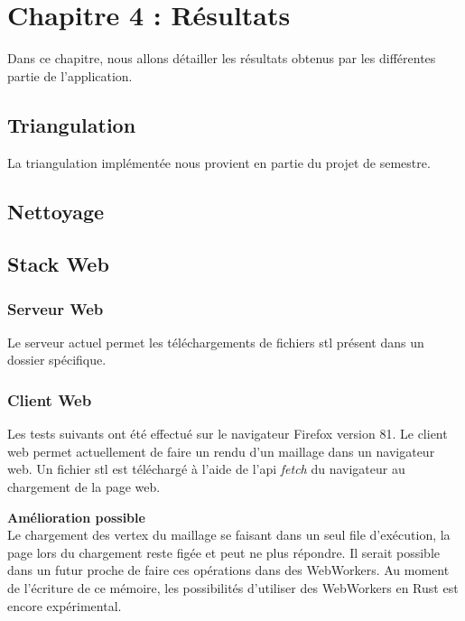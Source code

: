 
\chapter{Chapitre 4 : Résultats}
Dans ce chapitre, nous allons détailler les résultats obtenus par les
différentes partie de l'application.
\section{Triangulation}

La triangulation implémentée nous provient en partie du projet de semestre.

\section{Nettoyage}

\section{Stack Web}
\subsection{Serveur Web}

Le serveur actuel permet les téléchargements de fichiers \gls{stl} présent dans
un dossier spécifique. 

\subsection{Client Web}
Les tests suivants ont été effectué sur le navigateur Firefox version 81.
Le client web permet actuellement de faire un rendu d'un maillage dans un
navigateur web. Un fichier \gls{stl} est téléchargé à l'aide de l'api
\textit{fetch} du navigateur au chargement de la page web.

\textbf{Amélioration possible} \\
Le chargement des vertex du maillage se faisant dans un seul file d'exécution,
la page lors du chargement reste figée et peut ne plus répondre. Il serait
possible dans un futur proche de faire ces opérations dans des WebWorkers. Au
moment de l'écriture de ce mémoire, les possibilités d'utiliser des WebWorkers
en Rust est encore expérimental.
